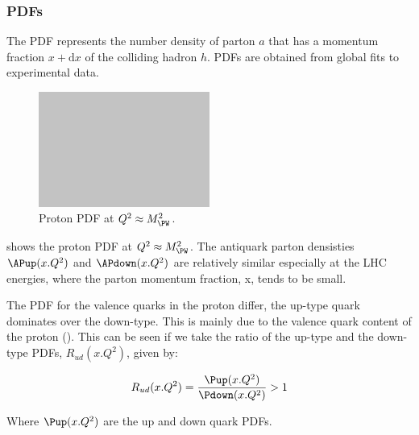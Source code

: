 

\subsubsection*{\acp{PDF}} 
The \ac{PDF} represents the number density of parton $a$ that has a momentum
fraction $x+\mathrm{d}x$ of the colliding hadron $h$.  \acp{PDF} are obtained
from global fits to experimental data. %

\begin{figure}[htb]
  \centering
  \includegraphics[width=0.5\textwidth]{placeholder}
  \caption{Proton PDF at $Q^2\approx M_{\PW}^2$.}
  \label{wbos:pdf}
\end{figure}

 shows the proton PDF at $Q^2\approx M_{\PW}^2$.  The
antiquark parton densisties $\APup(x.Q^2)$ and $\APdown(x.Q^2)$ are relatively
similar especially at the LHC energies, where the parton momentum fraction, x,
tends to be small.

The \ac{PDF} for the valence quarks in the proton differ, the up-type quark
dominates over the down-type. This is mainly due to the valence quark content
of the proton (\HepProcess{\Pup\Pup\Pdown}).  This can be seen if we take the
ratio of the up-type and the down-type \acp{PDF}, $R_{ud}(x.Q^2)$, given by:

\begin{equation}
  R_{ud}(x.Q^2) = \frac{\Pup(x.Q^2)}{ \Pdown(x.Q^2)} > 1
\end{equation}

Where $\Pup(x.Q^2)$ are the up and down quark \acp{PDF}.


